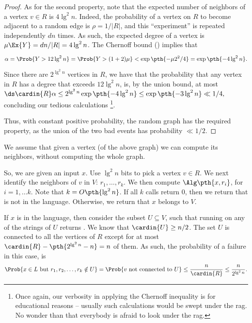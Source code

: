 \begin{proof}
    As for the second property, note that the expected number of
    neighbors of a vertex $v \in R$ is $4 \lg^2 n$.  Indeed, the
    probability of a vertex on $R$ to become adjacent to a random edge
    is $\rho = 1 / |R|$, and this ``experiment'' is repeated
    independently $d n$ times. As such, the expected degree of a
    vertex is $\mu \Ex{\bigl. Y} = dn/|R| = 4 \lg^2 n$. The Chernoff bound
    () implies that
    \begin{align*}
        \alpha%
        = %
        \Prob{\Bigl. Y > 12 \lg^2 n }%
        = %
        \Prob{\Bigl. Y > (1 + 2) \mu }%
        <%
        \exp\pth{ - \mu 2^2 / 4 }%
        =%
        \exp\pth{ -4 \lg^2 n}.
    \end{align*}
    Since there are $ 2^{\lg^2 n}$ vertices in $R$, we have that the
    probability that any vertex in $R$ has a degree that exceeds $12
    \lg^2 n$, is, by the union bound, at most
    \begin{math}
        \ds \cardin{R} \alpha \leq 2^{\lg^2 n} \exp\pth{ -4 \lg^2 n}
        \leq \exp\pth{ -3 \lg^2 n} \ll 1/4,
    \end{math}
    concluding our tedious calculations%
    \footnote{Once again, our verbosity in applying the Chernoff
       inequality is for educational reasons -- usually such
       calculations would be swept under the rag. No wonder than that
       everybody is afraid to look under the rag.}.
    
    Thus, with constant positive probability, the random graph has the
    required property, as the union of the two bad events has
    probability $\ll 1/2$.
\end{proof}





We assume that given a vertex (of the above graph) we can compute its
neighbors, without computing the whole graph.

So, we are given an input $x$.  Use $\lg^2{n}$ bits to pick a vertex
$v \in R$. We next identify the neighbors of $v$ in $V$: $r_1, \ldots,
r_k$. We then compute $\Alg\pth{ x, r_i}$, for $i=1,\ldots k$. Note
that $k = O\pth{\lg^2 n }$. If all $k$ calls return $0$, then we
return that \Alg is not in the language. Otherwise, we return that $x$
belongs to $V$.

If $x$ is in the language, then consider the subset $U\subseteq V$,
such that running \Alg on any of the strings of $U$ returns \TRUE. We
know that $\cardin{U} \geq n/2$. The set $U$ is connected to all the
vertices of $R$ except for at most $\cardin{R} - \pth{2^{\lg^2 n} -n}
= n$ of them. As such, the probability of a failure in this case, is
\begin{align*}
    \Prob{\Bigl. x \in L \text{ but } r_1, r_2, \ldots, r_k \notin U
    }%
    =%
    \Prob{\Bigl. v \text{ not connected to } U } \leq
    \frac{n}{\cardin{R}}%
    \leq%
    \frac{n}{2^{\lg^2 n }}.
\end{align*}

